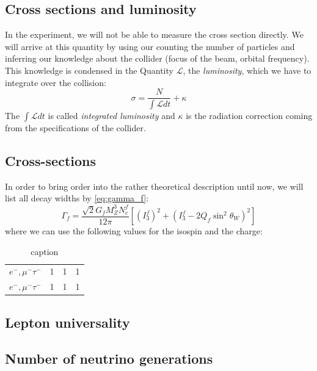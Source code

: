 \subsection{Cross sections and luminosity}
In the experiment, we will not be able to measure the cross section directly. We will arrive at this quantity by using our
counting the number of particles and inferring our knowledge about the collider (focus of the beam, orbital frequency). This
knowledge is condensed in the Quantity $\mathcal{L}$, the \textit{luminosity}, which we have to integrate over the collision:
\begin{equation}
    \sigma = \frac{N}{\int \mathcal{L} dt} + \kappa
\end{equation}
The $\int \mathcal{L} dt$ is called \textit{integrated luminosity} and $\kappa$ is the radiation correction coming from the
specifications of the collider.
\subsection{Cross-sections}
\label{sub:cross_sections}
In order to bring order into the rather theoretical description until now, we will list all decay widths by \eqref{eq:gamma_f}:
\begin{equation*}
    \Gamma_f = \frac{\sqrt{2} G_f M_Z^3 N_c^f}{12 \pi} \left[ (I_3^f)^2 + (I_3^f - 2 Q_f \sin^2 \theta_W )^2 \right]
\end{equation*}
where we can use the following values for the isospin and the charge:
\begin{table}[htpb]
    \centering
    \caption{caption}
    \label{tab:label}
    \begin{tabular}{l|l|l|l}
        $e^-,\mu^- \tau^-$ & 1   &1   & 1  \\
        $e^-,\mu^- \tau^-$ & 1   &1   & 1  
    \end{tabular}
\end{table}

\subsection{Lepton universality}
\label{sub:lepton_universality}

\subsection{Number of neutrino generations}
\label{sub:number_of_neutrino_generations}



